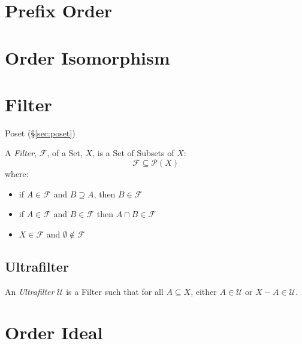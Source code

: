 \section{Prefix Order}\label{sec:prefix_order}

\section{Order Isomorphism}\label{sec:order_isomorphism}

\section{Filter}\label{sec:filter}

Poset (\S\ref{sec:poset})

A \emph{Filter}, $\mathcal{F}$, of a Set, $X$, is a Set of Subsets of
$X$:
\[
  \mathcal{F} \subseteq \mathcal{P}(X)
\]
where:
\begin{itemize}
\item if $A \in \mathcal{F}$ and $B \supseteq A$, then $B \in
  \mathcal{F}$
\item if $A \in \mathcal{F}$ and $B \in \mathcal{F}$ then $A \cap B
  \in \mathcal{F}$
\item $X \in \mathcal{F}$ and $\emptyset \notin \mathcal{F}$
\end{itemize}



\subsection{Ultrafilter}\label{sec:ultrafilter}

An \emph{Ultrafilter} $\mathcal{U}$ is a Filter such that for all $A
\subseteq X$, either $A \in \mathcal{U}$ or $X - A \in \mathcal{U}$.



\section{Order Ideal}\label{sec:order_ideal}

